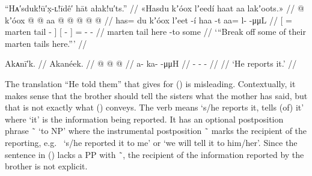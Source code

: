 \ex\label{ex:92-185-break-off-marten-tail}%
%
\begingl
	\glpreamble	“Hᴀ′sduk!ū′x̣-ʟ!īdê′ hāt ałak!u′ts.” //
	\glpreamble	«\!Hasdu kʼóox lʼeedí haat aa lakʼoots.\!» //
	\gla	{}  @ {} kʼóox  @ {} {}
		{}  @ {} {} aa @  @ {} @ {} @ {} @ {} //
	\glb	{} has= du kʼóox lʼeet -í {}
		{} haa -t {} aa= {} {} l-  -μμL //
	\glc	{}[ =  marten tail - {}]
		{}[  - {}]
		= \· \· -  - //
	\gld	{}  {} marten tail {} {}
		{} here -to {} some  {} {} {} {} //
	\glft	‘“Break off some of their marten tails here.”’
		//
\endgl
\xe

\ex\label{ex:92-186-he-tells}%
%
\begingl
	\glpreamble	Akᴀnī′k. //
	\glpreamble	Akanéek. //
	\gla	{} @ {} @ {} @ {} //
	\glb	a- ka-  -μμH //
	\glc	{}- -  - //
	\gld	{} {} {} {} //
	\glft	‘He reports it.’
		//
\endgl
\xe

The translation “He told them” that \citeauthor{swanton:1909} gives for (\lastx) is misleading.
Contextually, it makes sense that the brother should tell the sisters what the mother has said, but that is not exactly what (\lastx) conveys.
The verb  means ‘s/he reports it, tells (of) it’ where ‘it’ is the information being reported.
It has an optional postposition phrase  \~\  ‘to NP’ where the instrumental postposition  \~\  marks the recipient of the reporting, e.g.\  ‘s/he reported it to me’ or  ‘we will tell it to him/her’.
Since the sentence in (\lastx) lacks a PP with  \~\ , the recipient of the information reported by the brother is not explicit.

